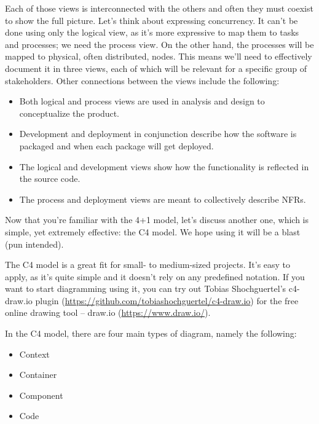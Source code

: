 Each of those views is interconnected with the others and often they must coexist to show the full picture. Let's think about expressing concurrency. It can't be done using only the logical view, as it's more expressive to map them to tasks and processes; we need the process view. On the other hand, the processes will be mapped to physical, often distributed, nodes. This means we'll need to effectively document it in three views, each of which will be relevant for a specific group of stakeholders. Other connections between the views include the following:


\begin{itemize}
\item
Both logical and process views are used in analysis and design to conceptualize the product.

\item 
Development and deployment in conjunction describe how the software is packaged and when each package will get deployed.

\item
The logical and development views show how the functionality is reflected in the source code.

\item
The process and deployment views are meant to collectively describe NFRs.
\end{itemize}

Now that you're familiar with the 4+1 model, let's discuss another one, which is simple, yet extremely effective: the C4 model. We hope using it will be a blast (pun intended).



The C4 model is a great fit for small- to medium-sized projects. It's easy to apply, as it's quite simple and it doesn't rely on any predefined notation. If you want to start diagramming using it, you can try out Tobias Shochguertel's c4-draw.io plugin (\url{https://github.com/tobiashochguertel/c4-draw.io}) for the free online drawing tool – draw.io (\url{https://www.draw.io/}).

In the C4 model, there are four main types of diagram, namely the following:


\begin{itemize}
\item
Context

\item 
Container

\item
Component

\item
Code
\end{itemize}

